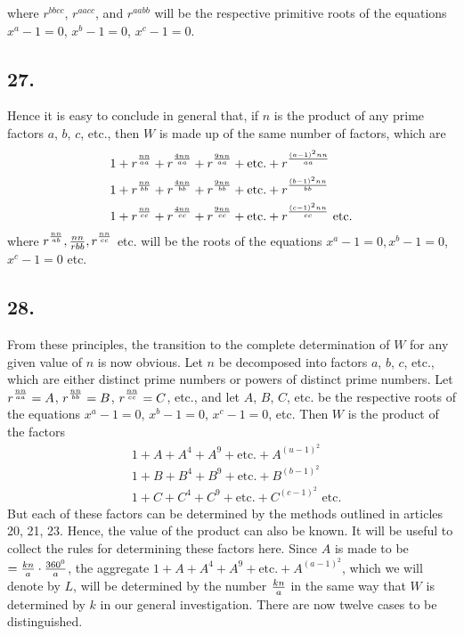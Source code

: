 \documentclass[twoside,12pt, showframe]{memoir}
\let\oldfrac\frac
\def\frac#1#2{\mathchoice{\tfrac{#1}{#2}}{\oldfrac{#1}{#2}}{\genfrac{}{}{}{2}{#1}{#2\mathstrut}}{\genfrac{}{}{}{3}{#1}{#2\mathstrut}}}
\begin{document}
where \(r^{bbcc}\), \(r^{aacc}\), and \(r^{aabb}\) will be the respective primitive roots of the equations \(x^a - 1 = 0\), \(x^b - 1 = 0\), \(x^c - 1 = 0\).
%

\subsection*{27.}

Hence it is easy to conclude in general that, if \(n\) is the product of any prime factors \(a\), \(b\), \(c\), etc., then \(W\) is made up of the same number of factors, which are
\[\begin{aligned}
& 1+r^{\frac{n n}{a a}}+r^{\frac{4 n n}{a a}}+r^{\frac{9 n n}{a a}}+\text{etc.}+r^{\frac{(a-1)^{2} n n}{a a}} \\
& 1+r^{\frac{n n}{b b}}+r^{\frac{4 n n}{b b}}+r^{\frac{9 n n}{b b}}+\text{etc.}+r^{\frac{(b-1)^{2} n n}{b b}} \\
& 1+r^{\frac{n n}{c c}}+r^{\frac{4 n n}{c c}}+r^{\frac{9 n n}{c c}}+\text{etc.}+r^{\frac{(c-1)^{2} n n}{c c}} \text{ etc.}
\end{aligned}\]
where \(r^{\frac{n n}{a b}}, \frac{n n}{r b b}, r^{\frac{n n}{c c}}\) etc. will be the roots of the equations \(x^{a}-1=0, x^{b}-1=0\), \(x^{c}-1=0\) etc.
%

\subsection*{28.}
 
From these principles, the transition to the complete determination of \(W\) for any given value of \(n\) is now obvious. Let \(n\) be decomposed into factors \(a\), \(b\), \(c\), etc., which are either distinct prime numbers or powers of distinct prime numbers. Let \(r^{\frac{n n}{a a}}=A\), \(r^{\frac{n n}{b b}}=B\), \(r^{\frac{n n}{c c}}=C\), etc., and let \(A\), \(B\), \(C\), etc. be the respective roots of the equations \(x^{a}-1=0\), \(x^{b}-1=0\), \(x^{c}-1=0\), etc. Then \(W\) is the product of the factors
\[\begin{aligned}
& 1+A+A^{4}+A^{9}+\text{etc.}+A^{(u-1)^{2}} \\
& 1+B+B^{4}+B^{9}+\text{etc.}+B^{(b-1)^{2}} \\
& 1+C+C^{4}+C^{9}+\text{etc.}+C^{(c-1)^{2}} \text{ etc.}
\end{aligned}\]
But each of these factors can be determined by the methods outlined in articles 20, 21, 23. Hence, the value of the product can also be known. It will be useful to collect the rules for determining these factors here. Since \(A\) is made to be \(=\frac{k n}{a} \cdot \frac{360^{0}}{a}\), the aggregate \(1+A+A^{4}+A^{9}+\text{etc.}+A^{(a-1)^{2}}\), which we will denote by \(L\), will be determined by the number \(\frac{k n}{a}\) in the same way that \(W\) is determined by \(k\) in our general investigation. There are now twelve cases to be distinguished.
\end{document}
